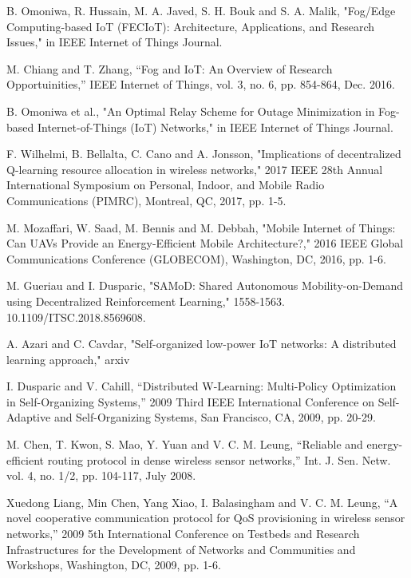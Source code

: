 \documentclass[journal]{IEEEtran}
\begin{document}
\begin{thebibliography}{1}
B. Omoniwa, R. Hussain, M. A. Javed, S. H. Bouk and S. A. Malik, "Fog/Edge Computing-based IoT (FECIoT): Architecture, Applications, and Research Issues," in IEEE Internet of Things Journal.

M. Chiang and T. Zhang, ``Fog and IoT: An Overview of Research Opportuinities,'' IEEE Internet of Things, vol. 3, no. 6, pp. 854-864, Dec.
2016.

B. Omoniwa et al., "An Optimal Relay Scheme for Outage Minimization in Fog-based Internet-of-Things (IoT) Networks," in IEEE Internet of Things Journal.

F. Wilhelmi, B. Bellalta, C. Cano and A. Jonsson, "Implications of decentralized Q-learning resource allocation in wireless networks," 2017 IEEE 28th Annual International Symposium on Personal, Indoor, and Mobile Radio Communications (PIMRC), Montreal, QC, 2017, pp. 1-5.

M. Mozaffari, W. Saad, M. Bennis and M. Debbah, "Mobile Internet of Things: Can UAVs Provide an Energy-Efficient Mobile Architecture?," 2016 IEEE Global Communications Conference (GLOBECOM), Washington, DC, 2016, pp. 1-6.

M. Gueriau and I. Dusparic, "SAMoD: Shared Autonomous Mobility-on-Demand using Decentralized Reinforcement Learning,"  1558-1563. 10.1109/ITSC.2018.8569608.

A. Azari and C. Cavdar, "Self-organized low-power IoT networks: A distributed learning approach," arxiv


I. Dusparic and V. Cahill, ``Distributed W-Learning: Multi-Policy Optimization in Self-Organizing Systems,'' 2009 Third IEEE International Conference on Self-Adaptive and Self-Organizing Systems, San Francisco, CA, 2009, pp. 20-29.


M. Chen, T. Kwon, S. Mao, Y. Yuan and V. C. M. Leung, ``Reliable and energy-efficient routing protocol in dense wireless sensor networks,'' Int. J. Sen. Netw.
 vol. 4, no. 1/2, pp. 104-117, July 2008.


Xuedong Liang, Min Chen, Yang Xiao, I. Balasingham and V. C. M. Leung, ``A novel cooperative communication protocol for QoS provisioning in wireless sensor networks,'' 2009 5th International Conference on Testbeds and Research Infrastructures for the Development of Networks and Communities and Workshops, Washington, DC, 2009, pp. 1-6.


\end{thebibliography}
\end{document}
